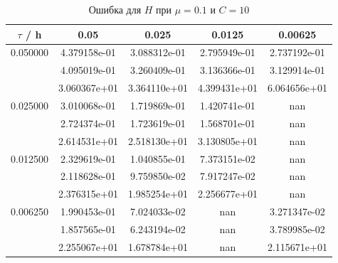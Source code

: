 \documentclass[specialist,subf,href,colorlinks=true,12pt
,times,mtpro,specialist
]{disser}
\begin{document}
\begin{table}[H]
\small
\caption{Ошибка для $H$ при $\mu=0.1$ и $C = 10$}
\begin{center}
\begin{tabular}{|c|c|c|c|c|}
\hline
$\tau$ / h & 0.05 & 0.025 & 0.0125 & 0.00625 \\
\hline
0.050000 & 4.379158e-01  & 3.088312e-01  & 2.795949e-01  & 2.737192e-01 \\
 & 4.095019e-01  & 3.260409e-01  & 3.136366e-01  & 3.129914e-01 \\
 & 3.060367e+01  & 3.364110e+01  & 4.399431e+01  & 6.064656e+01 \\
\hline
0.025000 & 3.010068e-01  & 1.719869e-01  & 1.420741e-01  & nan \\
 & 2.724374e-01  & 1.723619e-01  & 1.568701e-01  & nan \\
 & 2.614531e+01  & 2.518130e+01  & 3.130805e+01  & nan \\
\hline
0.012500 & 2.329619e-01  & 1.040855e-01  & 7.373151e-02  & nan \\
 & 2.118628e-01  & 9.759850e-02  & 7.917247e-02  & nan \\
 & 2.376315e+01  & 1.985254e+01  & 2.256677e+01  & nan \\
\hline
0.006250 & 1.990453e-01  & 7.024033e-02  & nan  & 3.271347e-02 \\
 & 1.857565e-01  & 6.243194e-02  & nan  & 3.789985e-02 \\
 & 2.255067e+01  & 1.678784e+01  & nan  & 2.115671e+01 \\
\hline
\end{tabular}
\end{center}
\end{table}
\end{document}
